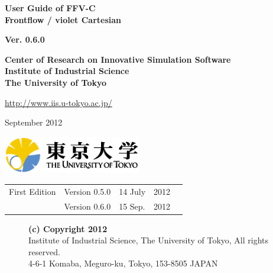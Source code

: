 \documentclass[a4paper,10pt,oneside,fleqn]{jsbook}
\begin{document}
\begin{titlepage}
\begin{center}
\vspace*{3cm}
{\huge \textbf{User Guide of FFV-C}}\\
\vspace{0.2cm}
{\huge \textbf{Frontflow / violet Cartesian}}\\
\vspace{1cm}

{\large \textbf{Ver. 0.6.0}}\\
\vspace{1.5cm}

{\large \textbf{Center of Research on Innovative Simulation Software}\\
\vspace{0.1cm}
\large \textbf{Institute of Industrial Science}\\
\large \textbf{The University of Tokyo}\\
\vspace{1cm}
}


\url{http://www.iis.u-tokyo.ac.jp/}\\
\vspace{1cm}

September 2012\\
\vspace{4cm}

\includegraphics[width=6cm]{UT.eps}

\end{center}
\end{titlepage}
\newpage

%
\frontmatter

\begin{tabular}{llllr}
First Edition  &  Version 0.5.0  &  14 July & 2012\\
                       &  Version 0.6.0  &  15 Sep.  & 2012
               

\end{tabular}

\vspace{15cm}

\begin{description}
\item[ ] \textbf{(c) Copyright 2012}\\
Institute of Industrial Science, The University of Tokyo, All rights reserved.\\
4-6-1 Komaba, Meguro-ku, Tokyo, 153-8505 JAPAN\\
\end{description}
\end{document}
